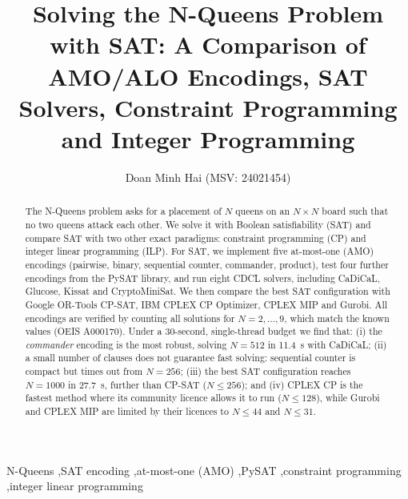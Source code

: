 \documentclass[a4paper,fleqn]{cas-sc}
\begin{document}
\let\WriteBookmarks\relax
\def\floatpagepagefraction{1}
\def\textpagefraction{.001}

\title [mode = title]{Solving the N-Queens Problem with SAT: A Comparison of AMO/ALO Encodings, SAT Solvers, Constraint Programming and Integer Programming}

\author[1]{Doan Minh Hai (MSV: 24021454)}

\begin{abstract}
The N-Queens problem asks for a placement of $N$ queens on an $N\times N$ board such that no two queens attack each other. We solve it with Boolean satisfiability (SAT) and compare SAT with two other exact paradigms: constraint programming (CP) and integer linear programming (ILP).
For SAT, we implement five at-most-one (AMO) encodings (pairwise, binary, sequential counter, commander, product), test four further encodings from the PySAT library, and run eight CDCL solvers, including CaDiCaL, Glucose, Kissat and CryptoMiniSat. We then compare the best SAT configuration with Google OR-Tools CP-SAT, IBM CPLEX CP Optimizer, CPLEX MIP and Gurobi.
All encodings are verified by counting all solutions for $N=2,\dots,9$, which match the known values (OEIS A000170).
Under a 30-second, single-thread budget we find that: (i) the \emph{commander} encoding is the most robust, solving $N=512$ in 11.4~s with CaDiCaL; (ii) a small number of clauses does not guarantee fast solving: sequential counter is compact but times out from $N=256$; (iii) the best SAT configuration reaches $N=1000$ in 27.7~s, further than CP-SAT ($N\le256$); and (iv) CPLEX CP is the fastest method where its community licence allows it to run ($N\le128$), while Gurobi and CPLEX MIP are limited by their licences to $N\le44$ and $N\le31$.
\end{abstract}

\begin{keywords}
N-Queens \sep SAT encoding \sep at-most-one (AMO) \sep PySAT \sep constraint programming \sep integer linear programming
\end{keywords}

\maketitle

\end{document}
